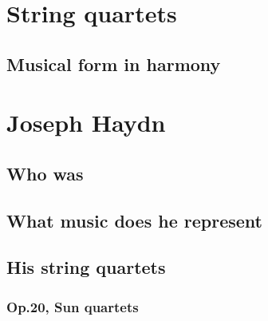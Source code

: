 \section{String quartets}
  \subsection{Musical form in harmony}
\section{Joseph Haydn}
  \subsection{Who was}
  \subsection{What music does he represent}
  \subsection{His string quartets}
    \subsubsection{Op.20, Sun quartets}

\newpage
